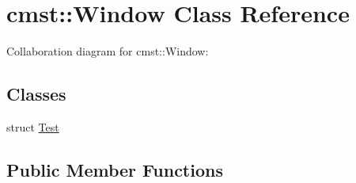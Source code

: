 \hypertarget{classcmst_1_1_window}{}\section{cmst::Window Class Reference}
\label{classcmst_1_1_window}


Collaboration diagram for cmst::Window:
\subsection*{Classes}
\begin{DoxyCompactItemize}
\item 
struct \hyperlink{structcmst_1_1_window_1_1_test}{Test}
\end{DoxyCompactItemize}
\subsection*{Public Member Functions}
